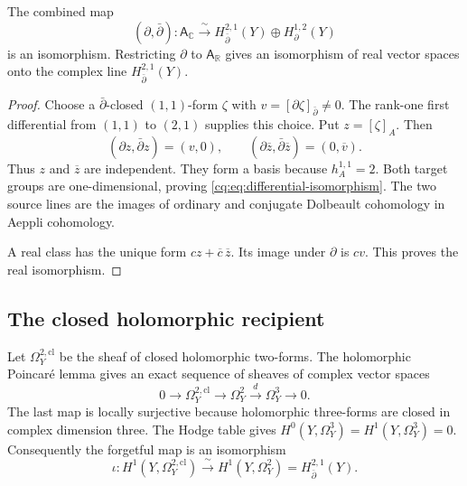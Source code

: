\begin{proposition}\label{cq:prop:two-differentials}
The combined map
\begin{equation}\label{cq:eq:differential-isomorphism}
 (\partial,\bar\partial):\mathsf A_{\mathbb C}
      \xrightarrow{\ \sim\ }
       H_{\bar\partial}^{2,1}(Y)\oplus H_\partial^{1,2}(Y)
\end{equation}
is an isomorphism. Restricting $\partial$ to $\mathsf A_{\mathbb R}$
gives an isomorphism of real vector spaces onto the complex line
$H_{\bar\partial}^{2,1}(Y)$.
\end{proposition}

\begin{proof}
Choose a $\bar\partial$-closed $(1,1)$-form $\zeta$ with
$v=[\partial\zeta]_{\bar\partial}\ne0$.
The rank-one first differential from $(1,1)$ to $(2,1)$
supplies this choice. Put $z=[\zeta]_A$.
Then
\[
 (\partial z,\bar\partial z)=(v,0),\qquad
 (\partial\overline z,\bar\partial\overline z)=(0,\overline v).
\]
Thus $z$ and $\overline z$ are independent.
They form a basis because $h_A^{1,1}=2$.
Both target groups are one-dimensional, proving
\eqref{cq:eq:differential-isomorphism}.
The two source lines are the images of ordinary and conjugate
Dolbeault cohomology in Aeppli cohomology.

A real class has the unique form
$cz+\overline c\,\overline z$.
Its image under $\partial$ is $cv$.
This proves the real isomorphism.
\end{proof}

\subsection{The closed holomorphic recipient}

Let $\Omega_Y^{2,\mathrm{cl}}$ be the sheaf of closed
holomorphic two-forms. The holomorphic Poincar\'e lemma gives
an exact sequence of sheaves of complex vector spaces
\begin{equation}\label{cq:eq:Poincare}
 0\longrightarrow\Omega_Y^{2,\mathrm{cl}}
 \longrightarrow\Omega_Y^2
 \xrightarrow{\ d\ }\Omega_Y^3\longrightarrow0.
\end{equation}
The last map is locally surjective because holomorphic
three-forms are closed in complex dimension three.
The Hodge table gives
$H^0(Y,\Omega_Y^3)=H^1(Y,\Omega_Y^3)=0$.
Consequently the forgetful map is an isomorphism
\begin{equation}\label{cq:eq:forgetful}
 \iota:H^1(Y,\Omega_Y^{2,\mathrm{cl}})
       \xrightarrow{\ \sim\ }H^1(Y,\Omega_Y^2)
       =H_{\bar\partial}^{2,1}(Y).
\end{equation}

